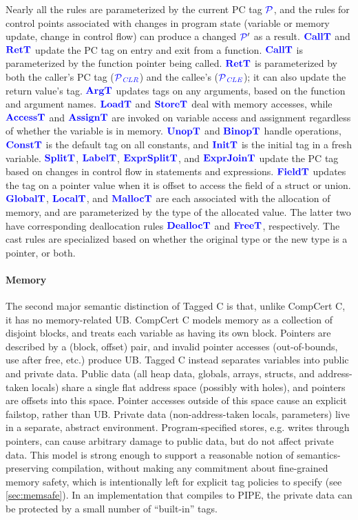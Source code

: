 \documentclass{llncs}
\begin{document}
Nearly all the rules are parameterized by the current PC tag \(\PCT\), and the rules
for control points associated with changes in program state (variable or memory update,
change in control flow) can produce a changed \(\PCT'\) as a result.
\(\calltname\)
and \(\rettname\) update the PC tag on entry and exit from a function.
\(\calltname\) is parameterized by the function pointer being called.
\(\rettname\) is parameterized by both the caller's PC tag (\(\PCT[_{\color{blue} CLR}]\))
and the callee's (\(\PCT[_{\color{blue} CLE}]\)); it can also update the return value's tag.
\(\argtname\) updates tags on any arguments, based on the function and argument names.
\(\loadtname\) and \(\storetname\) deal with memory accesses, while \(\accesstname\) and
\(\assigntname\) are invoked on variable access and assignment regardless of whether the variable
is in memory.
\(\unoptname\) and \(\binoptname\) handle operations, \(\consttname\) is the default tag
on all constants, and \(\inittname\) is the initial tag in a fresh variable.
\(\splittname\), \(\labeltname\), \(\exprsplittname\), and \(\exprjointname\) 
update the PC tag based on changes in control flow in statements and expressions.
\(\fieldtname\) updates the tag on a pointer value when it is offset to access the field of a struct or union.
\(\globaltname\), \(\localtname\),
and \(\malloctname\) are each associated with the allocation of memory, and are
parameterized by the type of the allocated value. The latter
two have corresponding deallocation rules \(\dealloctname\) and \(\freetname\),
respectively. The cast rules are specialized based on whether the original type or
the new type is a pointer, or both.

\paragraph{Memory} The second major semantic distinction of Tagged C is that, unlike CompCert C,
it has no memory-related UB. CompCert C models memory as a collection of disjoint blocks,
and treats each variable as having its own block. Pointers are described by a (block, offset) pair,
and invalid pointer accesses (out-of-bounds, use after free, etc.) produce UB.
Tagged C instead separates variables
into public and private data. Public data (all heap data, globals, arrays, structs, and
address-taken locals) share a single flat address space (possibly with holes), and pointers are
offsets into this space. Pointer accesses outside of this space cause
an explicit failstop, rather than UB. 
Private data (non-address-taken locals, parameters) live in a separate, abstract environment.
Program-specified stores, e.g. writes through pointers, can cause arbitrary damage to public
data, but do not affect private data. 
This model is strong enough to support a reasonable
notion of semantics-preserving compilation, without making any commitment about fine-grained
memory safety, which is intentionally left for explicit tag policies to specify (see \cref{sec:memsafe}).
In an implementation that compiles to PIPE, the private data can be protected by a small number of
``built-in'' tags.
\end{document}
